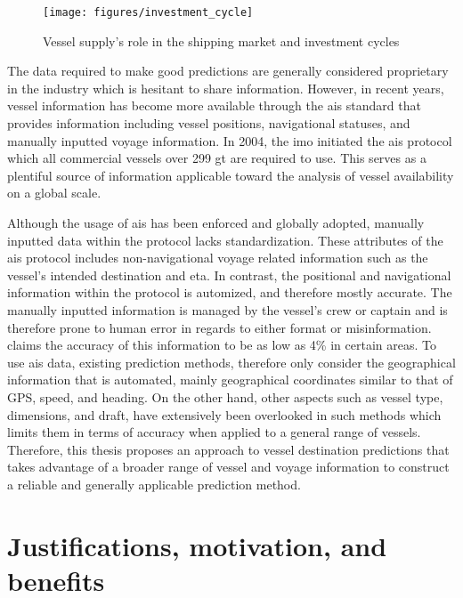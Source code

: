 \begin{figure}[htbp]
    \centering
    \texttt{[image: figures/investment\_cycle]}
    \caption{Vessel supply’s role in the shipping market and investment cycles \parencite{stopford2008}}
    \label{fig:maritime_economics}
\end{figure}

The data required to make good predictions are generally considered proprietary in the industry which is hesitant to share information. However, in recent years, vessel information has become more available through the \acrshort{ais} standard that provides information including vessel positions, navigational statuses, and manually inputted \gls{voyage} information. In 2004, the \acrfull{imo} initiated the \acrshort{ais} protocol which all commercial vessels over 299 \acrfull{gt} are required to use. This serves as a plentiful source of information applicable toward the analysis of vessel availability on a global scale.

Although the usage of \acrshort{ais} has been enforced and globally adopted, manually inputted data within the protocol lacks standardization. These attributes of the \acrshort{ais} protocol includes non-navigational \gls{voyage} related information such as the vessel's intended destination and \acrfull{eta}. In contrast, the positional and navigational information within the protocol is automized, and therefore mostly accurate. The manually inputted information is managed by the vessel's crew or captain and is therefore prone to human error in regards to either format or misinformation. \cite{mestl2016} claims the accuracy of this information to be as low as 4\% in certain areas. To use \acrshort{ais} data, existing prediction methods, therefore only consider the geographical information that is automated, mainly geographical coordinates similar to that of GPS\@, speed, and heading. On the other hand, other aspects such as vessel type, dimensions, and draft, have extensively been overlooked in such methods which limits them in terms of accuracy when applied to a general range of vessels. Therefore, this thesis proposes an approach to vessel destination predictions that takes advantage of a broader range of vessel and voyage information to construct a reliable and generally applicable prediction method.

\section{Justifications, motivation, and benefits}
\label{section:justifications_motivations_benefits}

